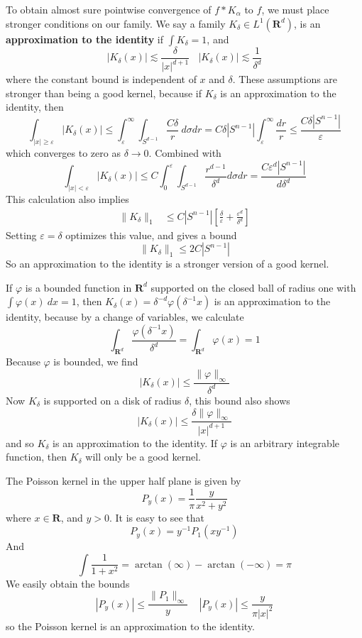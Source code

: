 To obtain almost sure pointwise convergence of $f * K_\alpha$ to $f$, we must place stronger conditions on our family. We say a family $K_\delta \in L^1(\mathbf{R}^d)$, is an {\bf approximation to the identity} if $\int K_\delta = 1$, and
%
\[ |K_\delta(x)| \lesssim \frac{\delta}{|x|^{d+1}}\ \ \ \ |K_\delta(x)| \lesssim \frac{1}{\delta^d} \]
%
where the constant bound is independent of $x$ and $\delta$. These assumptions are stronger than being a good kernel, because if $K_\delta$ is an approximation to the identity, then
%
\[ \int_{|x| \geq \varepsilon} |K_\delta(x)| \leq \int_\varepsilon^\infty \int_{S^{d-1}} \frac{C \delta}{r}\ d\sigma dr = C \delta |S^{n-1}| \int_\varepsilon^\infty \frac{dr}{r} \leq \frac{C \delta |S^{n-1}|}{\varepsilon} \]
%
which converges to zero as $\delta \to 0$. Combined with
%
\[ \int_{|x| < \varepsilon} |K_\delta(x)| \leq C \int_0^\varepsilon \int_{S^{d-1}} \frac{r^{d-1}}{\delta^d} d\sigma dr = \frac{C \varepsilon^d |S^{n-1}|}{d \delta^d} \]
%
This calculation also implies
%
\begin{align*}
    \| K_\delta \|_1 &\leq C |S^{n-1}| \left[ \frac{\delta}{\varepsilon} + \frac{\varepsilon^d}{\delta^d} \right]
\end{align*}
%
Setting $\varepsilon = \delta$ optimizes this value, and gives a bound
%
\[ \| K_\delta \|_1 \leq 2C |S^{n-1}| \]
%
So an approximation to the identity is a stronger version of a good kernel.

\begin{example}
    If $\varphi$ is a bounded function in $\mathbf{R}^d$ supported on the closed ball of radius one with $\int \varphi(x)\ dx = 1$, then $K_\delta(x) = \delta^{-d} \varphi(\delta^{-1}x)$ is an approximation to the identity, because by a change of variables, we calculate
    \[ \int_{\mathbf{R}^d} \frac{\varphi(\delta^{-1}x)}{\delta^d} = \int_{\mathbf{R}^d} \varphi(x) = 1 \]
    Because $\varphi$ is bounded, we find
    \[ |K_\delta(x)| \leq \frac{\| \varphi \|_\infty}{\delta^d} \]
    Now $K_\delta$ is supported on a disk of radius $\delta$, this bound also shows
    \[ |K_\delta(x)| \leq \frac{\delta \| \varphi \|_\infty}{|x|^{d+1}} \]
    and so $K_\delta$ is an approximation to the identity. If $\varphi$ is an arbitrary integrable function, then $K_\delta$ will only be a good kernel.
\end{example}

\begin{example}
    The Poisson kernel in the upper half plane is given by
    \[ P_y(x) = \frac{1}{\pi} \frac{y}{x^2 + y^2} \]
    where $x \in \mathbf{R}$, and $y > 0$. It is easy to see that
    \[ P_y(x) = y^{-1} P_1(xy^{-1}) \]
    And
    \[ \int \frac{1}{1 + x^2} = \arctan(\infty) - \arctan(-\infty) = \pi \]
    We easily obtain the bounds
    \[ |P_y(x)| \leq \frac{\| P_1 \|_\infty}{y}\ \ \ \ \ |P_y(x)| \leq \frac{y}{\pi |x|^2} \]
    so the Poisson kernel is an approximation to the identity.
\end{example}


